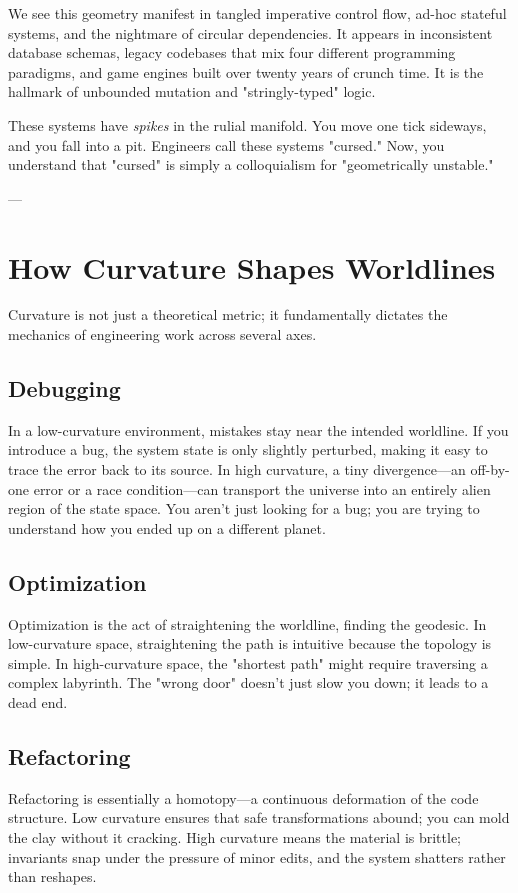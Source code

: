 We see this geometry manifest in tangled imperative control flow, ad-hoc stateful systems, and the nightmare of circular dependencies. It appears in inconsistent database schemas, legacy codebases that mix four different programming paradigms, and game engines built over twenty years of crunch time. It is the hallmark of unbounded mutation and "stringly-typed" logic.

These systems have \textit{spikes} in the rulial manifold. You move one tick sideways, and you fall into a pit. Engineers call these systems "cursed." Now, you understand that "cursed" is simply a colloquialism for "geometrically unstable."

---

\section{\texorpdfstring{\textbf{How Curvature Shapes Worldlines}}{9.4 --- How Curvature Shapes Worldlines}}

Curvature is not just a theoretical metric; it fundamentally dictates the mechanics of engineering work across several axes.

\subsection{\textbf{Debugging}}
In a low-curvature environment, mistakes stay near the intended worldline. If you introduce a bug, the system state is only slightly perturbed, making it easy to trace the error back to its source. In high curvature, a tiny divergence—an off-by-one error or a race condition—can transport the universe into an entirely alien region of the state space. You aren't just looking for a bug; you are trying to understand how you ended up on a different planet.

\subsection{\textbf{Optimization}}
Optimization is the act of straightening the worldline, finding the geodesic. In low-curvature space, straightening the path is intuitive because the topology is simple. In high-curvature space, the "shortest path" might require traversing a complex labyrinth. The "wrong door" doesn't just slow you down; it leads to a dead end.

\subsection{\textbf{Refactoring}}
Refactoring is essentially a homotopy—a continuous deformation of the code structure. Low curvature ensures that safe transformations abound; you can mold the clay without it cracking. High curvature means the material is brittle; invariants snap under the pressure of minor edits, and the system shatters rather than reshapes.

